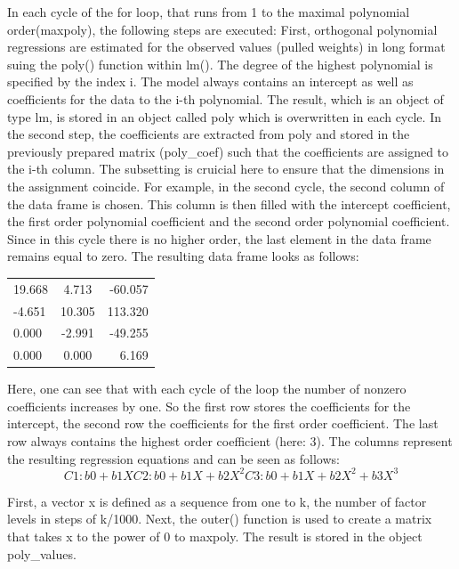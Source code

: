 \documentclass[11pt]{article}
\begin{document}
		
		In each cycle of the for loop, that runs from 1 to the maximal polynomial order(maxpoly), the following steps are executed:
		First, orthogonal polynomial regressions are estimated for the observed values (pulled weights) in long format suing the poly() function within lm(). The degree of the highest polynomial is specified by the index i. The model always contains an intercept as well as coefficients for the data to the i-th polynomial. The result, which is an object of type lm, is stored in an object called poly which is overwritten in each cycle.
		In the second step, the coefficients are extracted from poly and stored in the previously prepared matrix (poly\_coef) such that the coefficients are assigned to the i-th column. The subsetting is cruicial here to ensure that the dimensions in the assignment coincide. For example, in the second cycle, the second column of the data frame is chosen. This column is then filled with the intercept coefficient, the first order polynomial coefficient and the second order polynomial coefficient. Since in this cycle there is no higher order, the last element in the data frame remains equal to zero. The resulting data frame looks as follows:
		
		\begin{center}
			\begin{tabular}{ l | c | r }
				19.668 & 4.713  & -60.057 \\
				-4.651  & 10.305  & 113.320\\
				0.000 & -2.991  & -49.255 \\
				0.000 & 0.000  &  6.169 \\
			\end{tabular}
		\end{center}
		Here, one can see that with each cycle of the loop the number of nonzero coefficients increases by one. So the first row stores the coefficients for the intercept, the second row the coefficients for the first order coefficient. The last row always contains the highest order coefficient (here: 3). The columns represent the resulting regression equations and can be seen as follows:\\
		
		\begin{equation}
		C1: b0 + b1X
		C2: b0 + b1X + b2X^2
		C3: b0 + b1X + b2X^2 + b3X^3
		\end{equation}
		
		First, a vector x is defined as a sequence from one to k, the number of factor levels in steps of k/1000. Next, the outer() function is used to create a matrix that takes x to the power of 0 to maxpoly. The result is stored in the object poly\_values.\\
		
\end{document}
